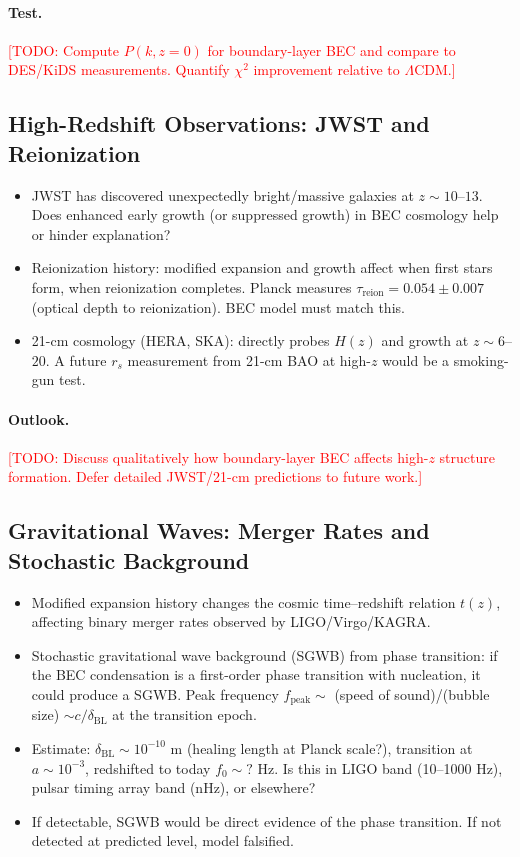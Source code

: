 \documentclass[11pt,a4paper]{article}
\newcommand{\deltaBL}{\ensuremath{\delta_{\mathrm{BL}}}}
\theoremstyle{definition}
\theoremstyle{remark}
\begin{document}
\paragraph{Test.}
\textcolor{red}{[TODO: Compute $P(k,z=0)$ for boundary-layer BEC and compare to DES/KiDS measurements. Quantify $\chi^2$ improvement relative to $\Lambda$CDM.]}

\subsection{High-Redshift Observations: JWST and Reionization}
\label{sec:high_z}

\begin{itemize}[leftmargin=*, itemsep=0.3em]
\item JWST has discovered unexpectedly bright/massive galaxies at $z \sim 10$--$13$. Does enhanced early growth (or suppressed growth) in BEC cosmology help or hinder explanation?
\item Reionization history: modified expansion and growth affect when first stars form, when reionization completes. Planck measures $\tau_{\mathrm{reion}} = 0.054 \pm 0.007$ (optical depth to reionization). BEC model must match this.
\item 21-cm cosmology (HERA, SKA): directly probes $H(z)$ and growth at $z \sim 6$--$20$. A future $r_s$ measurement from 21-cm BAO at high-$z$ would be a smoking-gun test.
\end{itemize}

\paragraph{Outlook.}
\textcolor{red}{[TODO: Discuss qualitatively how boundary-layer BEC affects high-$z$ structure formation. Defer detailed JWST/21-cm predictions to future work.]}

\subsection{Gravitational Waves: Merger Rates and Stochastic Background}
\label{sec:gw}

\begin{itemize}[leftmargin=*, itemsep=0.3em]
\item Modified expansion history changes the cosmic time--redshift relation $t(z)$, affecting binary merger rates observed by LIGO/Virgo/KAGRA.
\item Stochastic gravitational wave background (SGWB) from phase transition: if the BEC condensation is a first-order phase transition with nucleation, it could produce a SGWB. Peak frequency $f_{\mathrm{peak}} \sim$ (speed of sound)/(bubble size) $\sim c/\deltaBL$ at the transition epoch.
\item Estimate: $\deltaBL \sim 10^{-10}$ m (healing length at Planck scale?), transition at $a \sim 10^{-3}$, redshifted to today $f_0 \sim ?$ Hz. Is this in LIGO band (10--1000 Hz), pulsar timing array band (nHz), or elsewhere?
\item If detectable, SGWB would be direct evidence of the phase transition. If not detected at predicted level, model falsified.
\end{itemize}
\end{document}
